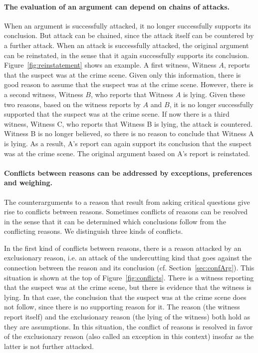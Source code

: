 \documentclass[10pt]{article}
\begin{document}
\paragraph{The evaluation of an argument can depend on chains of attacks.} When an argument is successfully attacked, it no longer successfully supports its conclusion. But attack can be chained, since the attack itself can be countered by a further attack. When an attack is successfully attacked, the original argument can be reinstated, in the sense that it again successfully supports its conclusion. Figure~\ref{fig:reinstatement} shows an example. A first witness, Witness $A$, reports that the suspect was at the crime scene. Given only this information, there is good reason to assume that the suspect was at the crime scene. However, there is a second witness, Witness $B$, who reports that Witness $A$ is lying. Given these two reasons, based on the witness reports by $A$ and $B$, it is no longer successfully supported that the suspect was at the crime scene. If now there is a third witness, Witness C, who reports that Witness B is lying, the attack is countered. Witness B is no longer believed, so there is no reason to conclude that Witness A is lying. As a result, A's report can again support its conclusion that the suspect was at the crime scene. The original argument based on A's report is reinstated. 

\paragraph{Conflicts between reasons can be addressed by exceptions, preferences and weighing.} The counterarguments to a reason that result from asking critical questions give rise to conflicts between reasons. Sometimes conflicts of reasons can be resolved in the sense that it can be determined which conclusions follow from the conflicting reasons. We distinguish three kinds of conflicts. 

In the first kind of conflicts between reasons, there is a reason attacked by an exclusionary reason, i.e. an attack of the undercutting kind that goes against the connection between the reason and its conclusion (cf. Section~\ref{sec:confArg}). This situation is shown at the top of Figure~\ref{fig:conflicts}. There is a witness reporting that the suspect was at the crime scene, but there is evidence that the witness is lying. 
In that case, the conclusion that the suspect was at the crime scene does not follow, since there is no supporting reason for it. The reason (the witness report itself) and the exclusionary reason (the lying of the witness) both hold as they are assumptions. %
In this situation, %
the conflict of reasons is resolved in favor of the exclusionary reason (also called an exception in this context) insofar as the latter is not further attacked.
\end{document}
